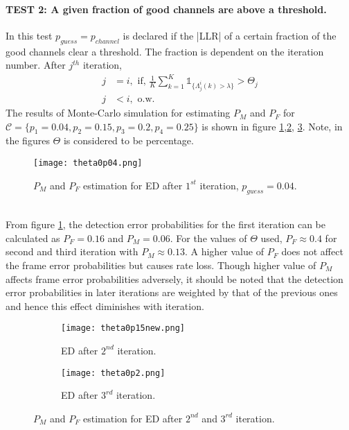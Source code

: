 \documentclass[
11pt, %
a4paper, %
oneside, %
headinclude,footinclude, %
BCOR5mm, %
]{scrartcl}
\begin{document}
\paragraph{TEST 2: A given fraction of good channels are above a threshold.}  
In this test $p_{guess}=p_{channel}$ is declared if the |LLR| of a certain fraction of the good channels clear a threshold. The fraction is dependent on the iteration number. After $j^{th}$ iteration,
\begin{align*}  
j &=i,
 \text{   if, } \frac{1}{K}\sum^K_{k=1} \mathbb{1}_{\{\Lambda_{j}^i(k) > \lambda\}} > \Theta_j \\
j & < i,  \text{ o.w. }
\end{align*} 
The results of Monte-Carlo simulation for estimating $P_M$ and $P_F$ for $\mathcal{C}=\{p_1=0.04,p_2=0.15,p_3=0.2,p_4=0.25\}$ is shown in figure \ref{fig:theta1},\ref{fig:theta2}, \ref{fig:theta3}. Note, in the figures $\Theta$ is considered to be percentage.
\begin{figure}[h]
 \begin{center}
    \texttt{[image: theta0p04.png]}
  \end{center}
  \caption{$P_M$ and $P_F$ estimation for ED after $1^{st}$ iteration, $p_{guess}=0.04$.}
  \label{fig:theta1}
\end{figure}\\
From figure \ref{fig:theta1}, the detection error probabilities for the first  iteration can be calculated as $P_F=0.16$ and $P_M=0.06$. For the values of $\Theta$ used, $P_F\approx0.4$  for second and third iteration with $P_M\approx0.13$. A higher value of $P_F$ does not affect the frame error probabilities but causes rate loss. Though higher value of $P_M$ affects frame error probabilities adversely, it should be noted that the detection error probabilities in later iterations are weighted by that of the previous ones and hence this effect diminishes with iteration.
\begin{figure}[h]
\centering
\begin{subfigure}{0.5\textwidth}
    \centering
    \texttt{[image: theta0p15new.png]}
    \caption{ED after $2^{nd}$ iteration.}
    \label{fig:theta2}
\end{subfigure}
\begin{subfigure}{0.5\textwidth}
    \centering
    \texttt{[image: theta0p2.png]}
    \caption{ED after $3^{rd}$ iteration.}
    \label{fig:theta3}
\end{subfigure}
\caption{$P_M$ and $P_F$ estimation for ED after $2^{nd}$ and $3^{rd}$ iteration.}
\label{fig:theta23}
\end{figure}
\end{document}
